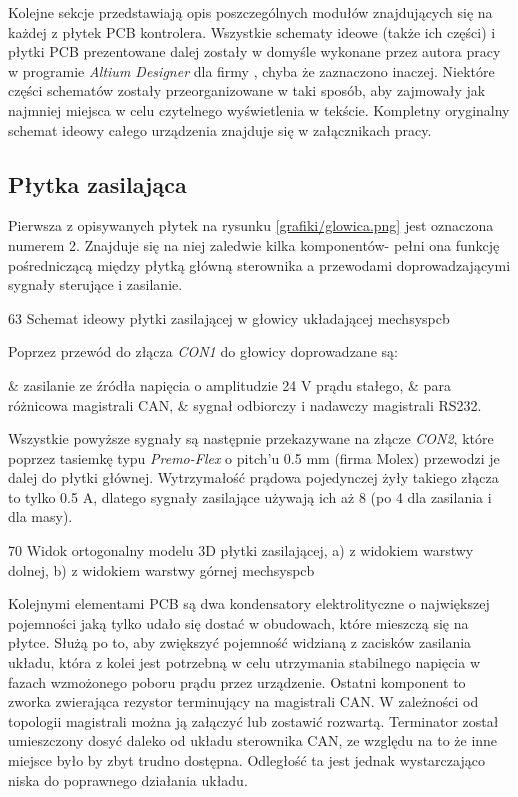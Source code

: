 Kolejne sekcje przedstawiają opis poszczególnych modułów znajdujących się na każdej z płytek PCB kontrolera. Wszystkie schematy ideowe (także ich części) i płytki PCB prezentowane dalej zostały w domyśle wykonane przez autora pracy w programie {\it Altium Designer} dla firmy \firma{}, chyba że zaznaczono inaczej. Niektóre części schematów zostały przeorganizowane w taki sposób, aby zajmowały jak najmniej miejsca w celu czytelnego wyświetlenia w tekście. Kompletny oryginalny schemat ideowy całego urządzenia znajduje się w załącznikach pracy.

\subsection{Płytka zasilająca}

Pierwsza z opisywanych płytek na rysunku \ref{grafiki/glowica.png} jest oznaczona numerem 2. Znajduje się na niej zaledwie kilka komponentów- pełni ona funkcję pośredniczącą między płytką główną sterownika a przewodami doprowadzającymi sygnały sterujące i zasilanie.

	{63}
	{Schemat ideowy płytki zasilającej w głowicy układającej}
	{mechsyspcb}
	
Poprzez przewód do złącza {\it CON1} do głowicy doprowadzane są:

\begin{easylist}
	& zasilanie ze źródła napięcia o amplitudzie 24 V prądu stałego,
	& para różnicowa magistrali CAN,
	& sygnał odbiorczy i nadawczy magistrali RS232.
	\\
\end{easylist} 

Wszystkie powyższe sygnały są następnie przekazywane na złącze {\it CON2}, które poprzez tasiemkę typu {\it Premo-Flex} o pitch'u 0.5 mm (firma Molex) przewodzi je dalej do płytki głównej. Wytrzymałość prądowa pojedynczej żyły takiego złącza to tylko 0.5 A, dlatego sygnały zasilające używają ich aż 8 (po 4 dla zasilania i dla masy).

	{70}
	{Widok ortogonalny modelu 3D płytki zasilającej, a) z widokiem warstwy dolnej, b) z widokiem warstwy górnej}
	{mechsyspcb}

Kolejnymi elementami PCB są dwa kondensatory elektrolityczne o największej pojemności jaką tylko udało się dostać w obudowach, które mieszczą się na płytce. Służą po to, aby zwiększyć pojemność widzianą z zacisków zasilania układu, która z kolei jest potrzebną w celu utrzymania stabilnego napięcia w fazach wzmożonego poboru prądu przez urządzenie. Ostatni komponent to zworka zwierająca rezystor terminujący na magistrali CAN. W zależności od topologii magistrali można ją załączyć lub zostawić rozwartą. Terminator został umieszczony dosyć daleko od układu sterownika CAN, ze względu na to że inne miejsce było by zbyt trudno dostępna. Odległość ta jest jednak wystarczająco niska do poprawnego działania układu.

